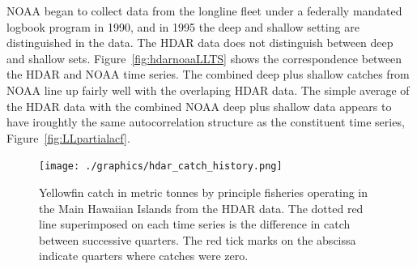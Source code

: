\documentclass[12pt,letterpaper]{article}
\newcommand\help[1]{\color{Magenta}{\it #1 }\normalcolor}
\begin{document}
NOAA began to collect data from the longline fleet under a federally
mandated logbook program in 1990, and in 1995 the deep and shallow
setting are distinguished in the data. The HDAR data does not
distinguish between deep and shallow sets.
Figure~\ref{fig:hdarnoaaLLTS} shows the correspondence between the
HDAR and NOAA time series. The combined deep plus shallow catches from
NOAA line up fairly well with the overlaping HDAR data. The simple
average of the HDAR data with the combined NOAA deep plus shallow data
appears to have iroughtly the same autocorrelation structure as the
constituent time series, Figure~\ref{fig:LLpartialacf}.
\help{Data are also available from NOAA for the period 1990-1995, but
have not yet been included in this analysis.}


\begin{figure}
\begin{center}
\texttt{[image: ./graphics/hdar\_catch\_history.png]}
\caption{\label{fig:hdarTS}
Yellowfin catch in metric tonnes by principle fisheries operating in
the Main Hawaiian Islands from the HDAR data.
The dotted red line superimposed on each time series is the difference in
catch between successive quarters.
The red tick marks on the abscissa indicate quarters where catches
were zero.
}
\end{center}
\end{figure}
\end{document}
